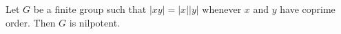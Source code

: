


\begin{theorem}
	Let $G$ be a finite group such that $|xy|=|x||y|$ whenever $x$ and $y$ have coprime order. Then
	$G$ is nilpotent. 
\end{theorem}

